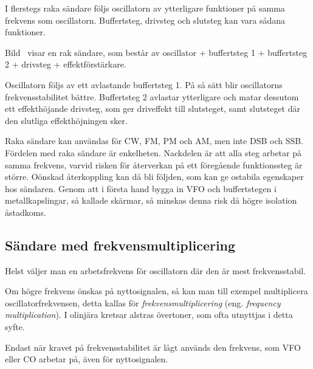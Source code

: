 I flerstegs raka sändare följs oscillatorn av ytterligare funktioner på samma
frekvens som oscillatorn.
Buffertsteg, drivsteg och slutsteg kan vara sådana funktioner.

Bild~ visar en rak sändare, som består av oscillator +
buffertsteg 1 + buffertsteg 2 + drivsteg + effektförstärkare.

Oscillatorn följs av ett avlastande buffertsteg 1.
På så sätt blir oscillatorns frekvensstabilitet bättre.
Buffertsteg 2 avlastar ytterligare och matar dessutom ett effekthöjande
drivsteg, som ger driveffekt till slutsteget, samt slutsteget där den slutliga
effekthöjningen sker.

Raka sändare kan användas för CW, FM, PM och AM, men inte DSB och SSB.
Fördelen med raka sändare är enkelheten.
Nackdelen är att alla steg arbetar på samma frekvens, varvid risken för
återverkan på ett föregående funktionssteg är större.
Oönskad återkoppling kan då bli följden, som kan ge ostabila egenskaper hos
sändaren.
Genom att i första hand bygga in VFO och buffertstegen i metallkapslingar,
så kallade skärmar, så minskas denna risk då högre isolation åstadkoms.

\subsection{Sändare med frekvensmultiplicering}

Helst väljer man en arbetsfrekvens för oscillatorn där den är mest
frekvensstabil.

Om högre frekvens önskas på nyttosignalen, så kan man
till exempel multiplicera oscillatorfrekvensen, detta kallas för
\emph{frekvensmultiplicering} (eng. \emph{frequency multiplication}).
I olinjära kretsar alstras övertoner, som ofta utnyttjas i detta syfte.

Endast när kravet på frekvensstabilitet är lågt används den frekvens,
som VFO eller CO arbetar på, även för nyttosignalen.


